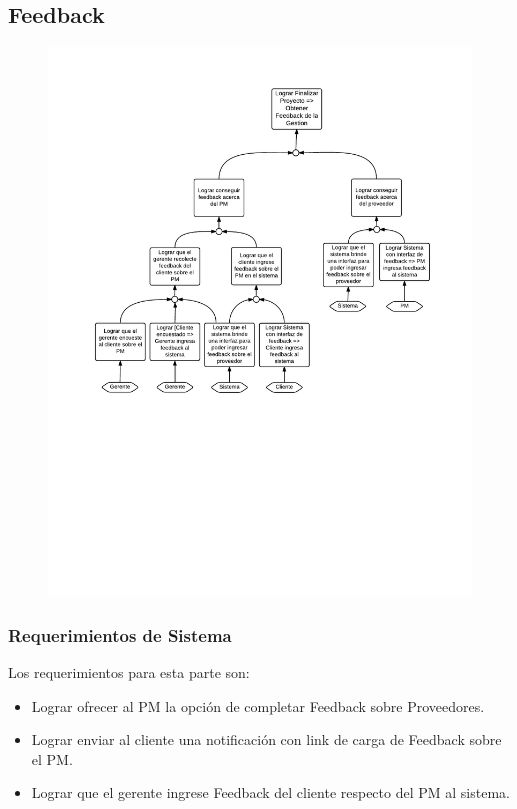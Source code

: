 \subsection{Feedback}
\begin{figure}[H]
\includegraphics[width=\textwidth, clip=true, trim=15pt 290pt 15pt 40pt]{imagenes/objetivos/objetivos17.pdf}
\end{figure}

\subsubsection{Requerimientos de Sistema}
Los requerimientos para esta parte son:
\begin{itemize}
	\item Lograr ofrecer al PM la opción de completar Feedback sobre Proveedores.
	\item Lograr enviar al cliente una notificación con link de carga de Feedback sobre el PM.
	\item Lograr que el gerente ingrese Feedback del cliente respecto del PM al sistema.
\end{itemize}
